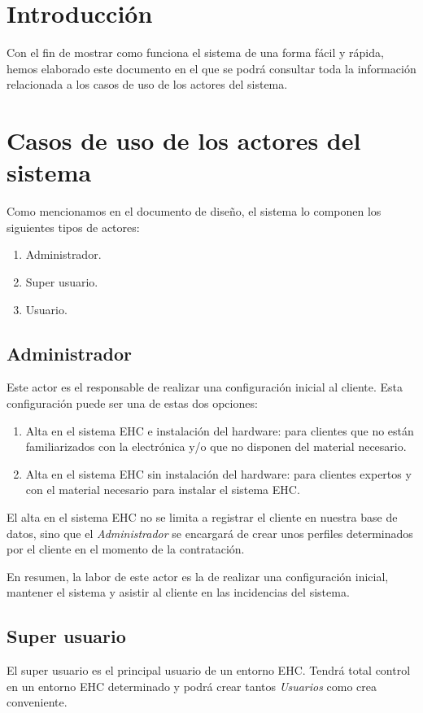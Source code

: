\section{Introducci\'on}
Con el fin de mostrar como funciona el sistema de una forma f\'acil y r\'apida, hemos elaborado este documento en el que se podr\'a consultar toda la informaci\'on relacionada a los casos de uso de los actores del sistema.

\section{Casos de uso de los actores del sistema}
Como mencionamos en el documento de dise\~no, el sistema lo componen los siguientes tipos de actores:
\begin{enumerate}
\item Administrador.
\item Super usuario.
\item Usuario.
\end{enumerate}

\subsection{Administrador}
Este actor es el responsable de realizar una configuraci\'on inicial al cliente. Esta configuraci\'on puede ser una de estas dos opciones:
\begin{enumerate}
\item Alta en el sistema EHC e instalaci\'on del hardware: para clientes que no est\'an familiarizados con la electr\'onica y/o que no disponen del material necesario.
\item Alta en el sistema EHC sin instalaci\'on del hardware: para clientes expertos y con el material necesario para instalar el sistema EHC.
\end{enumerate}

El alta en el sistema EHC no se limita a registrar el cliente en nuestra base de datos, sino que el \textit{Administrador} se encargar\'a de crear unos perfiles determinados por el cliente en el momento de la contrataci\'on.

En resumen, la labor de este actor es la de realizar una configuraci\'on inicial, mantener el sistema y asistir al cliente en las incidencias del sistema.

\subsection{Super usuario}
El super usuario es el principal usuario de un entorno EHC. Tendr\'a total control en un entorno EHC determinado y podr\'a crear tantos \textit{Usuarios} como crea conveniente.


